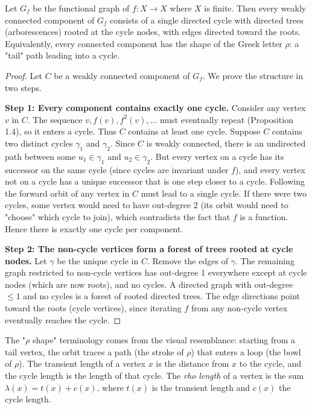 \begin{theorem}
Let $G_f$ be the functional graph of $f: X \to X$ where $X$ is finite. Then every weakly connected component of $G_f$ consists of a single directed cycle with directed trees (arborescences) rooted at the cycle nodes, with edges directed toward the roots. Equivalently, every connected component has the shape of the Greek letter $\rho$: a "tail" path leading into a cycle.


\end{theorem}

\begin{proof}
Let $C$ be a weakly connected component of $G_f$. We prove the structure in two steps.

\textbf{Step 1: Every component contains exactly one cycle.} Consider any vertex $v$ in $C$. The sequence $v, f(v), f^2(v), \ldots$ must eventually repeat (Proposition 1.4), so it enters a cycle. Thus $C$ contains at least one cycle. Suppose $C$ contains two distinct cycles $\gamma_1$ and $\gamma_2$. Since $C$ is weakly connected, there is an undirected path between some $u_1 \in \gamma_1$ and $u_2 \in \gamma_2$. But every vertex on a cycle has its successor on the same cycle (since cycles are invariant under $f$), and every vertex not on a cycle has a unique successor that is one step closer to a cycle. Following the forward orbit of any vertex in $C$ must lead to a single cycle. If there were two cycles, some vertex would need to have out-degree 2 (its orbit would need to "choose" which cycle to join), which contradicts the fact that $f$ is a function. Hence there is exactly one cycle per component.

\textbf{Step 2: The non-cycle vertices form a forest of trees rooted at cycle nodes.} Let $\gamma$ be the unique cycle in $C$. Remove the edges of $\gamma$. The remaining graph restricted to non-cycle vertices has out-degree 1 everywhere except at cycle nodes (which are now roots), and no cycles. A directed graph with out-degree $\leq 1$ and no cycles is a forest of rooted directed trees. The edge directions point toward the roots (cycle vertices), since iterating $f$ from any non-cycle vertex eventually reaches the cycle. 
\end{proof}

\begin{remark}
The "$\rho$ shape" terminology comes from the visual resemblance: starting from a tail vertex, the orbit traces a path (the stroke of $\rho$) that enters a loop (the bowl of $\rho$). The transient length of a vertex $x$ is the distance from $x$ to the cycle, and the cycle length is the length of that cycle. The \textit{rho length} of a vertex is the sum $\lambda(x) = t(x) + c(x)$, where $t(x)$ is the transient length and $c(x)$ the cycle length.
\end{remark}

